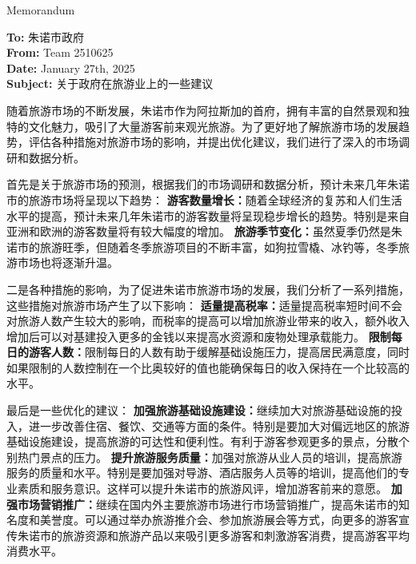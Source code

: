 \documentclass[12pt]{article}  %
\begin{document}
\begin{letter}{Memorandum}
\begin{flushleft}  %
\textbf{To:} 朱诺市政府\\
\textbf{From:} Team 2510625\\
\textbf{Date:} January 27th, 2025\\
\textbf{Subject:} 关于政府在旅游业上的一些建议
\end{flushleft}

随着旅游市场的不断发展，朱诺市作为阿拉斯加的首府，拥有丰富的自然景观和独特的文化魅力，吸引了大量游客前来观光旅游。为了更好地了解旅游市场的发展趋势，评估各种措施对旅游市场的影响，并提出优化建议，我们进行了深入的市场调研和数据分析。

首先是关于旅游市场的预测，根据我们的市场调研和数据分析，预计未来几年朱诺市的旅游市场将呈现以下趋势：
\textbf{游客数量增长：}随着全球经济的复苏和人们生活水平的提高，预计未来几年朱诺市的游客数量将呈现稳步增长的趋势。特别是来自亚洲和欧洲的游客数量将有较大幅度的增加。
\textbf{旅游季节变化：}虽然夏季仍然是朱诺市的旅游旺季，但随着冬季旅游项目的不断丰富，如狗拉雪橇、冰钓等，冬季旅游市场也将逐渐升温。

二是各种措施的影响，为了促进朱诺市旅游市场的发展，我们分析了一系列措施，这些措施对旅游市场产生了以下影响：
\textbf{适量提高税率：}适量提高税率短时间不会对旅游人数产生较大的影响，而税率的提高可以增加旅游业带来的收入，额外收入增加后可以对基建投入更多的金钱以来提高水资源和废物处理承载能力。
\textbf{限制每日的游客人数：}限制每日的人数有助于缓解基础设施压力，提高居民满意度，同时如果限制的人数控制在一个比奥较好的值也能确保每日的收入保持在一个比较高的水平。

最后是一些优化的建议：
\textbf{加强旅游基础设施建设：}继续加大对旅游基础设施的投入，进一步改善住宿、餐饮、交通等方面的条件。特别是要加大对偏远地区的旅游基础设施建设，提高旅游的可达性和便利性。有利于游客参观更多的景点，分散个别热门景点的压力。
\textbf{提升旅游服务质量：}加强对旅游从业人员的培训，提高旅游服务的质量和水平。特别是要加强对导游、酒店服务人员等的培训，提高他们的专业素质和服务意识。这样可以提升朱诺市的旅游风评，增加游客前来的意愿。
\textbf{加强市场营销推广：}继续在国内外主要旅游市场进行市场营销推广，提高朱诺市的知名度和美誉度。可以通过举办旅游推介会、参加旅游展会等方式，向更多的游客宣传朱诺市的旅游资源和旅游产品以来吸引更多游客和刺激游客消费，提高游客平均消费水平。

\end{letter}
\end{document}
